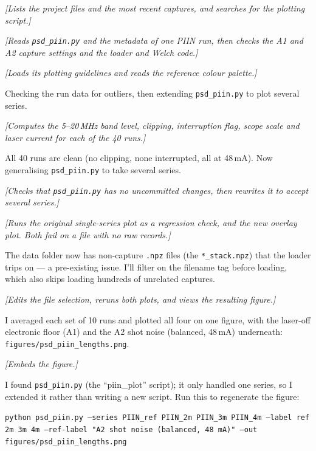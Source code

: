  \begin{tcolorbox}[breakable, colback=gray!4, colframe=gray!50,
 	boxrule=0.4pt, arc=2pt, fontupper=\small,
 	left=6pt, right=6pt, top=4pt, bottom=4pt]
 	\textit{[Lists the project files and the most recent captures, and searches for the plotting script.]}
 	
 	\textit{[Reads \texttt{psd\_piin.py} and the metadata of one PIIN run, then checks the A1 and A2 capture settings and the loader and Welch code.]}
 	
 	\textit{[Loads its plotting guidelines and reads the reference colour palette.]}
 	
 	Checking the run data for outliers, then extending \texttt{psd\_piin.py} to plot several series.
 	
 	\textit{[Computes the 5--20\,MHz band level, clipping, interruption flag, scope scale and laser current for each of the 40 runs.]}
 	
 	All 40 runs are clean (no clipping, none interrupted, all at 48\,mA). Now generalising \texttt{psd\_piin.py} to take several series.
 	
 	\textit{[Checks that \texttt{psd\_piin.py} has no uncommitted changes, then rewrites it to accept several series.]}
 	
 	\textit{[Runs the original single-series plot as a regression check, and the new overlay plot. Both fail on a file with no raw records.]}
 	
 	The data folder now has non-capture \texttt{.npz} files (the \texttt{*\_stack.npz}) that the loader trips on --- a pre-existing issue. I'll filter on the filename tag before loading, which also skips loading hundreds of unrelated captures.
 	
 	\textit{[Edits the file selection, reruns both plots, and views the resulting figure.]}
 	
 	I averaged each set of 10 runs and plotted all four on one figure, with the laser-off electronic floor (A1) and the A2 shot noise (balanced, 48\,mA) underneath: \texttt{figures/psd\_piin\_lengths.png}.
 	
 	\textit{[Embeds the figure.]}
 	
 	I found \texttt{psd\_piin.py} (the ``piin\_plot'' script); it only handled one series, so I extended it rather than writing a new script. Run this to regenerate the figure:
 	
 	\texttt{python psd\_piin.py --series PIIN\_ref PIIN\_2m PIIN\_3m PIIN\_4m --label ref 2m 3m 4m --ref-label "A2 shot noise (balanced, 48 mA)" --out figures/psd\_piin\_lengths.png}
 	

\end{tcolorbox}
